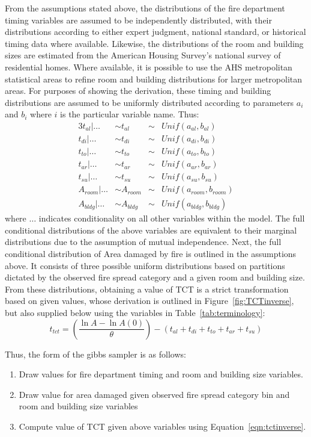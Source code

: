 \documentclass[12pt,oneside]{book}
\begin{document}
From the assumptions stated above, the distributions of the fire department timing variables are assumed to be independently distributed, with their distributions according to either expert judgment, national standard, or historical timing data where available. Likewise, the distributions of the room and building sizes are estimated from the American Housing Survey's national survey of residential homes. Where available, it is possible to use the AHS metropolitan statistical areas to refine room and building distributions for larger metropolitan areas. For purposes of showing the derivation, these timing and building distributions are assumed to be uniformly distributed according to parameters $a_i$ and $b_i$ where $i$ is the particular variable name. Thus:
\begin{alignat*}{3}
  t_{al}|\dots &\sim t_{al} &\sim& Unif(a_{al},b_{al}) \\
  t_{di}|\dots &\sim t_{di} &\sim& Unif(a_{di},b_{di}) \\
  t_{to}|\dots &\sim t_{to} &\sim& Unif(a_{to},b_{to}) \\
  t_{ar}|\dots &\sim t_{ar} &\sim& Unif(a_{ar},b_{ar}) \\
  t_{su}|\dots &\sim t_{su} &\sim& Unif(a_{su},b_{su}) \\
  A_{room}|\dots &\sim A_{room} &\sim& Unif(a_{room},b_{room}) \\
  A_{bldg}|\dots &\sim A_{bldg} &\sim& Unif(a_{bldg},b_{bldg}) 
\end{alignat*}
where $\dots$ indicates conditionality on all other variables within the model. The full conditional distributions of the above variables are equivalent to their marginal distributions due to the assumption of mutual independence. Next, the full conditional distribution of Area damaged by fire is outlined in the assumptions above. It consists of three possible uniform distributions based on partitions dictated by the observed fire spread category and a given room and building size. From these distributions, obtaining a value of TCT is a strict transformation based on given values, whose derivation is outlined in Figure~\ref{fig:TCTinverse}, but also supplied below using the variables in Table~\ref{tab:terminology}:
\begin{equation}
  \label{eqn:tctinverse}
  t_{tct} = \left(\frac{\ln A - \ln A(0)}{\theta}\right)-\left(t_{al}+t_{di}+t_{to}+t_{ar}+t_{su}\right)
\end{equation}

Thus, the form of the gibbs sampler is as follows:
\begin{enumerate}
  \item Draw values for fire department timing and room and building size variables.
  \item Draw value for area damaged given observed fire spread category bin and room and building size variables
  \item Compute value of TCT given above variables using Equation~\ref{eqn:tctinverse}.
\end{enumerate}
\end{document}

